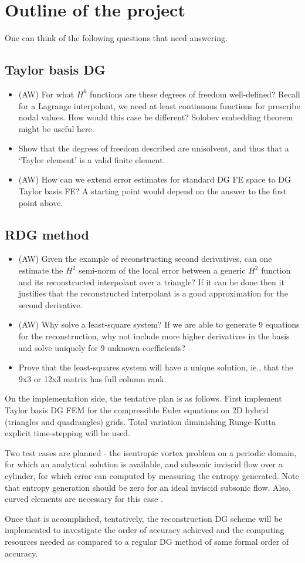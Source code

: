 \documentclass[11pt]{article}
\begin{document}
\section{Outline of the project}
One can think of the following questions that need answering.
\subsection{Taylor basis DG}
\begin{itemize}
\item (AW) For what $H^k$ functions are these degrees of freedom well-defined? Recall for a Lagrange interpolant, we need at least continuous functions for prescribe nodal values. How would this case be different? Solobev embedding theorem might be useful here.
\item Show that the degrees of freedom described are unisolvent, and thus that a `Taylor element' is a valid finite element.
\item (AW) How can we extend error estimates for standard DG FE space to DG Taylor basis FE? A starting point would depend on the answer to the first point above.
\end{itemize}
\subsection{RDG method}
\begin{itemize}
\item (AW) Given the example of reconstructing second derivatives, can one estimate the $H^2$ semi-norm of the local error between a generic $H^2$ function and its reconstructed interpolant over a triangle? If it can be done then it justifies that the reconstructed interpolant is a good approximation for the second derivative.
\item (AW) Why solve a least-square system? If we are able to generate 9 equations for the reconstruction, why not include more higher derivatives in the basis and solve uniquely for 9 unknown coefficients?
\item Prove that the least-squares system will have a unique solution, ie., that the 9x3 or 12x3 matrix has full column rank.
\end{itemize}

On the implementation side, the tentative plan is as follows. First implement Taylor basis DG FEM for the compressible Euler equations on 2D hybrid (triangles and quadrangles) grids. Total variation diminishing Runge-Kutta explicit time-stepping will be used.

Two test cases are planned - the isentropic vortex problem on a periodic domain, for which an analytical solution is available, and subsonic inviscid flow over a cylinder, for which error can computed by measuring the entropy generated. Note that entropy generation should be zero for an ideal inviscid subsonic flow. Also, curved elements are necessary for this case \cite{bassi_dgeuler}.

Once that is accomplished, tentatively, the reconstruction DG scheme will be implemented to investigate the order of accuracy achieved and the computing resources needed as compared to a regular DG method of same formal order of accuracy.


\end{document}
